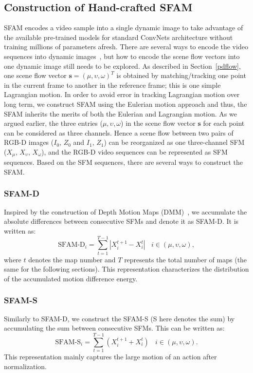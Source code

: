 \documentclass[10pt,twocolumn,letterpaper]{article}
\begin{document}
\subsection{Construction of Hand-crafted SFAM }\label{sfam}
SFAM encodes a video sample into a single dynamic image to 
take advantage of the available pre-trained models for standard ConvNets 
architecture without training millions of parameters afresh. There are several 
ways to encode the video sequences into dynamic 
images~\cite{bobick2001recognition,
man2006individual,
Yang2012a,pichao2015,pichaoTHMS,bilen2016dynamic}, but how to encode 
the scene flow vectors into one dynamic image still needs to be explored. As 
described in Section~\ref{pdflow}, one scene flow vector $\textbf{s} = 
(\mu,\upsilon,\omega)^{T}$ is obtained by matching/tracking one point in the 
current frame to another in the reference frame; this is one simple Lagrangian 
motion. In order to avoid error in tracking Lagrangian motion over long term, 
we construct SFAM using the Eulerian motion approach and thus, the SFAM 
inherits the merits of both the Eulerian and Lagrangian motion. As we argued 
earlier, the three entries ($\mu,\upsilon,\omega$) in the scene flow vector 
$\textbf{s}$ for each point can be considered as three channels. Hence a
scene flow between two pairs of RGB-D images ($I_{0}$, $Z_{0}$ and $I_{1}$, 
$Z_{1}$) can be reorganized as one three-channel SFM ($X_{\mu}$, 
$X_{\upsilon}$, $X_{\omega}$), and the RGB-D video sequences can be represented 
as SFM sequences. Based on the SFM sequences, there are several ways to 
construct the SFAM. 

\subsubsection{SFAM-D}
Inspired by the construction of Depth Motion Maps (DMM)~\cite{Yang2012a}, 
we accumulate the absolute differences between consecutive SFMs and denote it 
as SFAM-D. It is written as:
\begin{equation}
\text{SFAM-D}_{i}  =  \sum\limits_{t=1}^{T-1} |X_{i}^{t+1} - X_{i}^{t}|  ~~~~      i \in (\mu,\upsilon,\omega),                     
\end{equation}
where $t$ denotes the map number and $T$ represents the total number of maps (the same for the following sections). This representation characterizes the distribution of the accumulated motion difference energy. 

\subsubsection{SFAM-S}
Similarly to SFAM-D, we construct the SFAM-S (S here denotes the sum) by 
accumulating the sum between consecutive SFMs. This can be written as:
\begin{equation}
\text{SFAM-S}_{i}  =  \sum\limits_{t=1}^{T-1} (X_{i}^{t+1} + X_{i}^{t})  ~~~~      i \in (\mu,\upsilon,\omega).                     
\end{equation}
This representation mainly captures the large motion of an action after normalization.
\end{document}
